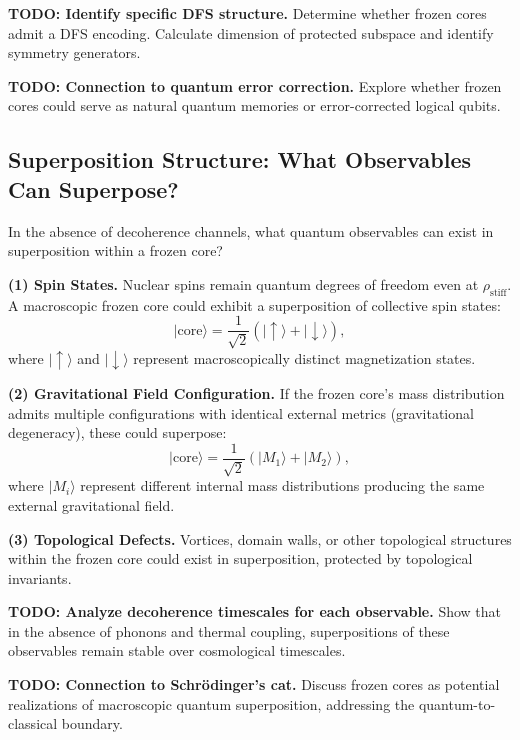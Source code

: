 \documentclass[11pt,a4paper]{article}
\newcommand{\rhostiff}{\ensuremath{\rho_{\mathrm{stiff}}}}
\newcommand{\psiket}[1]{\ensuremath{|#1\rangle}}
\theoremstyle{definition}
\theoremstyle{remark}
\begin{document}
\textbf{TODO: Identify specific DFS structure.} Determine whether frozen cores admit a DFS encoding. Calculate dimension of protected subspace and identify symmetry generators.

\textbf{TODO: Connection to quantum error correction.} Explore whether frozen cores could serve as natural quantum memories or error-corrected logical qubits.

\subsection{Superposition Structure: What Observables Can Superpose?}
\label{sec:superposition_structure}

In the absence of decoherence channels, what quantum observables can exist in superposition within a frozen core?

\textbf{(1) Spin States.} Nuclear spins remain quantum degrees of freedom even at $\rhostiff$. A macroscopic frozen core could exhibit a superposition of collective spin states:
\begin{equation}
\label{eq:spin_superposition}
\psiket{\text{core}} = \frac{1}{\sqrt{2}}\left(\psiket{\uparrow} + \psiket{\downarrow}\right),
\end{equation}
where $\psiket{\uparrow}$ and $\psiket{\downarrow}$ represent macroscopically distinct magnetization states.

\textbf{(2) Gravitational Field Configuration.} If the frozen core's mass distribution admits multiple configurations with identical external metrics (gravitational degeneracy), these could superpose:
\begin{equation}
\label{eq:grav_superposition}
\psiket{\text{core}} = \frac{1}{\sqrt{2}}\left(\psiket{M_1} + \psiket{M_2}\right),
\end{equation}
where $\psiket{M_i}$ represent different internal mass distributions producing the same external gravitational field.

\textbf{(3) Topological Defects.} Vortices, domain walls, or other topological structures within the frozen core could exist in superposition, protected by topological invariants.

\textbf{TODO: Analyze decoherence timescales for each observable.} Show that in the absence of phonons and thermal coupling, superpositions of these observables remain stable over cosmological timescales.

\textbf{TODO: Connection to Schr\"odinger's cat.} Discuss frozen cores as potential realizations of macroscopic quantum superposition, addressing the quantum-to-classical boundary.
\end{document}
